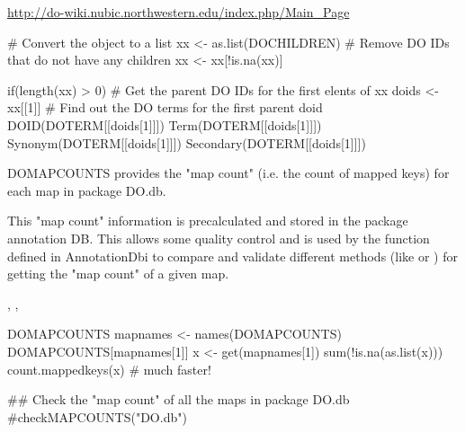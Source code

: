 \documentclass[a4paper]{book}
\begin{document}
%
\begin{References}\relax
\url{http://do-wiki.nubic.northwestern.edu/index.php/Main_Page} 

\end{References}
%
\begin{Examples}
\begin{ExampleCode}
  # Convert the object to a list
  xx <- as.list(DOCHILDREN)
  # Remove DO IDs that do not have any children
  xx <- xx[!is.na(xx)]
  
  if(length(xx) > 0){
     # Get the parent DO IDs for the first elents of xx
        doids <- xx[[1]]
        # Find out the DO terms for the first parent doid
        DOID(DOTERM[[doids[1]]])
        Term(DOTERM[[doids[1]]])
        Synonym(DOTERM[[doids[1]]])
        Secondary(DOTERM[[doids[1]]])
  }
\end{ExampleCode}
\end{Examples}
%
\begin{Description}\relax
DOMAPCOUNTS provides the "map count" (i.e. the
count of mapped keys) for each map in package DO.db.
\end{Description}
%
\begin{Details}\relax
  
This "map count" information is precalculated and stored in the
package annotation DB. This allows some quality control and is used by
the 
function defined in AnnotationDbi to compare and validate different
methods (like  or
) for getting the "map count" of a given
map.
\end{Details}
%
\begin{SeeAlso}\relax
{},
,
\end{SeeAlso}
%
\begin{Examples}
\begin{ExampleCode}
  DOMAPCOUNTS
  mapnames <- names(DOMAPCOUNTS)
  DOMAPCOUNTS[mapnames[1]]
  x <- get(mapnames[1])
  sum(!is.na(as.list(x)))
  count.mappedkeys(x)   # much faster!

  ## Check the "map count" of all the maps in package DO.db
  #checkMAPCOUNTS("DO.db")
\end{ExampleCode}
\end{Examples}
\end{document}
